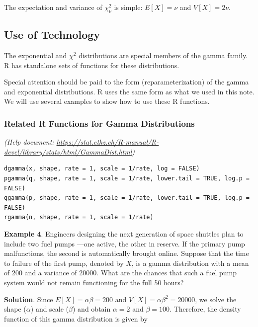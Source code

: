 \documentclass[
]{book}
\begin{document}
The expectation and variance of \(\chi_\nu^2\) is simple: \(E[X] = \nu\) and \(V[X] = 2\nu\).

\hfill\break

\hypertarget{use-of-technology}{%
\subsection{Use of Technology}\label{use-of-technology}}

The exponential and \(\chi^2\) distributions are special members of the gamma family. R has standalone sets of functions for these distributions.

Special attention should be paid to the form (reparameterization) of the gamma and exponential distributions. R uses the same form as what we used in this note. We will use several examples to show how to use these R functions.

\hypertarget{related-r-functions-for-gamma-distributions}{%
\subsubsection{Related R Functions for Gamma Distributions}\label{related-r-functions-for-gamma-distributions}}

\emph{(Help document: \url{https://stat.ethz.ch/R-manual/R-devel/library/stats/html/GammaDist.html})}

\begin{verbatim}
dgamma(x, shape, rate = 1, scale = 1/rate, log = FALSE)
pgamma(q, shape, rate = 1, scale = 1/rate, lower.tail = TRUE, log.p = FALSE)
qgamma(p, shape, rate = 1, scale = 1/rate, lower.tail = TRUE, log.p = FALSE)
rgamma(n, shape, rate = 1, scale = 1/rate)
\end{verbatim}

\textbf{Example 4}. Engineers designing the next generation of space shuttles plan to include two fuel pumps ---one active, the other in reserve. If the primary pump malfunctions, the second is automatically brought online. Suppose that the time to failure of the first pump, denoted by \(X\), is a gamma distribution with a mean of 200 and a variance of 20000. What are the chances that such a fuel pump system would not remain functioning for the full 50 hours?

\textbf{Solution}. Since \(E[X] = \alpha\beta = 200\) and \(V[X] = \alpha \beta^2 = 20000\), we solve the shape (\(\alpha\)) and scale (\(\beta\)) and obtain \(\alpha = 2\) and \(\beta = 100\). Therefore, the density function of this gamma distribution is given by
\end{document}
